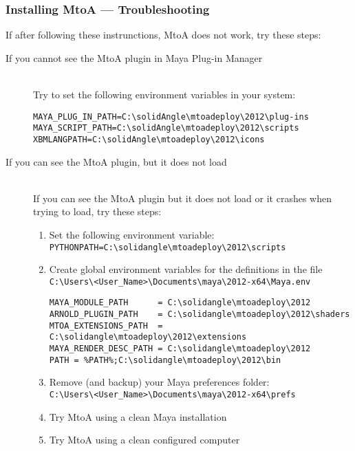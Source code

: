 \subsubsection{Installing MtoA --- Troubleshooting}
If after following these instrunctions, MtoA does not work, try these steps:

\begin{description}

\item[If you cannot see the MtoA plugin in Maya Plug-in Manager] \hfill \\
Try to set the following environment variables in your system:
{\footnotesize \begin{verbatim}
MAYA_PLUG_IN_PATH=C:\solidAngle\mtoadeploy\2012\plug-ins
MAYA_SCRIPT_PATH=C:\solidAngle\mtoadeploy\2012\scripts
XBMLANGPATH=C:\solidAngle\mtoadeploy\2012\icons
\end{verbatim}}

\item[If you can see the MtoA plugin, but it does not load] \hfill \\
If you can see the MtoA plugin but it does not load or it crashes when trying to load, try these steps:
\begin{enumerate}
\item Set the following environment variable:\\
\verb|PYTHONPATH=C:\solidangle\mtoadeploy\2012\scripts|

\item Create global environment variables for the definitions in the file\\
\verb|C:\Users\<User_Name>\Documents\maya\2012-x64\Maya.env|\\

{\footnotesize \begin{verbatim}
MAYA_MODULE_PATH      = C:\solidangle\mtoadeploy\2012
ARNOLD_PLUGIN_PATH    = C:\solidangle\mtoadeploy\2012\shaders
MTOA_EXTENSIONS_PATH  = C:\solidangle\mtoadeploy\2012\extensions
MAYA_RENDER_DESC_PATH = C:\solidangle\mtoadeploy\2012
PATH = %PATH%;C:\solidangle\mtoadeploy\2012\bin
\end{verbatim}}

\item Remove (and backup) your Maya preferences folder:\\
\verb|C:\Users\<User_Name>\Documents\maya\2012-x64\prefs|

\item Try MtoA using a clean Maya installation

\item Try MtoA using a clean configured computer

\end{enumerate}

\end{description}

